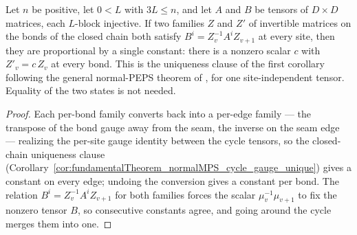 \begin{corollary}%
    \label{cor:fundamentalTheorem_normalMPS_gauge_unique}
    \leanok
    Let $n$ be positive, let $0 < L$ with $3L \le n$, and let $A$ and $B$ be
    tensors of $D \times D$ matrices, each $L$-block injective.  If two
    families $Z$ and $Z'$ of invertible matrices on the bonds of the closed
    chain both satisfy $B^i = Z_v^{-1} A^i Z_{v+1}$ at every site, then they
    are proportional by a single constant: there is a nonzero scalar $c$
    with $Z'_v = c\,Z_v$ at every bond.  This is the uniqueness clause of
    the first corollary following the general normal-PEPS theorem of
    \cite[Section~3]{Molnar2018NormalPEPS}, for one site-independent
    tensor.  Equality of the two states is not needed.
\end{corollary}
\begin{proof}\leanok
    Each per-bond family converts back into a per-edge family — the
    transpose of the bond gauge away from the seam, the inverse on the seam
    edge — realizing the per-site gauge identity between the cycle tensors,
    so the closed-chain uniqueness clause
    (Corollary~\ref{cor:fundamentalTheorem_normalMPS_cycle_gauge_unique})
    gives a constant on every edge; undoing the conversion gives a constant
    per bond.  The relation $B^i = Z_v^{-1} A^i Z_{v+1}$ for both families
    forces the scalar $\mu_v^{-1}\mu_{v+1}$ to fix the nonzero tensor $B$,
    so consecutive constants agree, and going around the cycle merges them
    into one.
\end{proof}

